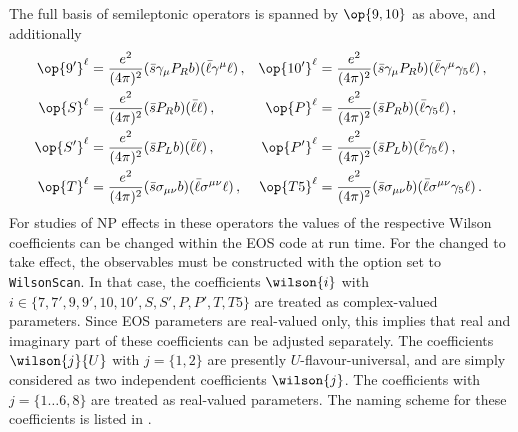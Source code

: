 The full basis of semileptonic operators is spanned by $\op{9,10}$ as above, and additionally
\begin{align}
  \op{9'}^{\ell}  & = \frac{e^2}{(4\pi)^2} (\bar{s} \gamma_\mu P_R b) 
                      (\bar{\ell} \gamma^\mu \ell) \,, &
  \op{10'}^{\ell} & = \frac{e^2}{(4\pi)^2} (\bar{s} \gamma_\mu P_R b)
                      (\bar{\ell} \gamma^\mu \gamma_5 \ell) \,,\\
  \op{S}^{\ell}   & = \frac{e^2}{(4\pi)^2} (\bar{s} P_R b)
                      (\bar{\ell} \ell) \,, &
  \op{P}^{\ell}   & = \frac{e^2}{(4\pi)^2} (\bar{s} P_R b)
                      (\bar{\ell} \gamma_5 \ell) \,,\\
  \op{S'}^{\ell}  & = \frac{e^2}{(4\pi)^2} (\bar{s} P_L b)
                      (\bar{\ell} \ell) \,, &
  \op{P'}^{\ell}  & = \frac{e^2}{(4\pi)^2} (\bar{s} P_L b)
                      (\bar{\ell} \gamma_5 \ell) \,,\\
  \op{T}^{\ell}   & = \frac{e^2}{(4\pi)^2} (\bar{s} \sigma_{\mu\nu} b)
                      (\bar{\ell} \sigma^{\mu\nu} \ell) \,, &
  \op{T5}^{\ell}  & = \frac{e^2}{(4\pi)^2} (\bar{s} \sigma_{\mu\nu} b)
                      (\bar{\ell} \sigma^{\mu\nu} \gamma_5 \ell) \,.
\end{align}
For studies of NP effects in these operators the values of the respective Wilson coefficients
can be changed within the EOS code at run time. For the changed to take effect, the observables
must be constructed with the option  set to \texttt{WilsonScan}. In that case, the
coefficients $\wilson{i}$ with $i\in \lbrace 7,7',9,9',10,10',S,S',P,P',T,T5\rbrace$ are treated
as complex-valued parameters.
Since EOS parameters are real-valued only, this implies that real and
imaginary part of these coefficients can be adjusted separately.
The coefficients $\wilson{j}{U}$ with $j=\lbrace 1,2\rbrace$ are presently
$U$-flavour-universal, and are simply considered as two independent coefficients $\wilson{j}$.
The coefficients with $j=\lbrace 1\dots 6, 8\rbrace$ are treated as real-valued parameters.
The naming scheme for these coefficients is listed in .
